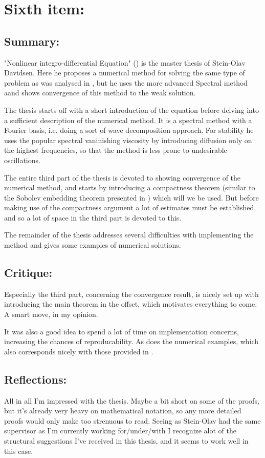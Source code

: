 \documentclass[11pt, a4paper]{article}
\begin{document}
\section{Sixth item:}
\subsection{Summary:}
"Nonlinear integro-differential Equation" (\cite{davidsen2013nonlinear}) is the master thesis of Stein-Olav Davidsen. Here he proposes a numerical method for solving the same type of problem as was analysed in \cite{Cifani}, but he uses the more advanced Spectral method aand shows convergence of this method to the weak solution.

The thesis starts off with a short introduction of the equation before delving into a sufficient description of the numerical method. It is a spectral method with a Fourier basis, i.e. doing a sort of wave decomposition approach. For stability he uses the popular spectral vaninishing viscosity by introducing diffusion only on the highest frequencies, so that the method is less prone to undesirable oscillations.

The entire third part of the thesis is devoted to showing convergence of the numerical method, and starts by introducing a compactness theorem (similar to the Sobolev embedding theorem presented in \cite{evans}) which will we be used. But before making use of the compactness argument a lot of estimates must be established, and so a lot of space in the third part is devoted to this.

The remainder of the thesis addresses several difficulties with implementing the method and gives some examples of numerical solutions.

\subsection{Critique:}
Especially the third part, concerning the convergence result, is nicely set up with introducing the main theorem in the offset, which motivates everything to come. A smart move, in my opinion.

It was also a good idea to spend a lot of time on implementation concerns, increasing the chances of reproducability. As does the numerical examples, which also corresponds nicely with those provided in \cite{Cifani}.

\subsection{Reflections:}
All in all I'm impressed with the thesis. Maybe a bit short on some of the proofs, but it's already very heavy on mathematical notation, so any more detailed proofs would only make too strenuous to read. Seeing as Stein-Olav had the same supervisor as I'm currently working for/under/with I recognize alot of the structural suggestions I've received in this thesis, and it seems to work well in this case.
\end{document}
